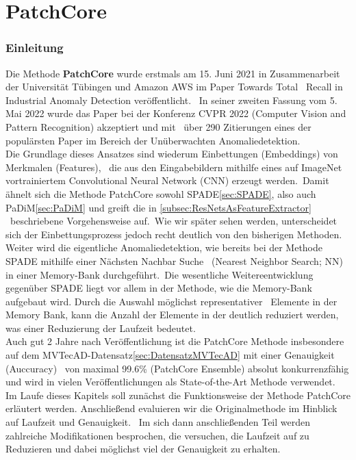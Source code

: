 
\chapter{PatchCore \cite{patchcore}}\label{ch:PatchCore}
\subsection{Einleitung}
Die Methode \textbf{PatchCore} wurde erstmals am 15. Juni 2021 in Zusammenarbeit der Universität Tübingen und Amazon AWS im Paper \glqq Towards Total \ 
Recall in Industrial Anomaly Detection\grqq{} veröffentlicht. \ 
In seiner zweiten Fassung vom 5. Mai 2022 wurde das Paper bei der Konferenz CVPR 2022 (Computer Vision and Pattern Recognition) akzeptiert und mit \ 
über 290 Zitierungen eines der populärsten Paper im Bereich der Unüberwachten Anomaliedetektion.\\
Die Grundlage dieses Ansatzes sind wiederum \glqq Einbettungen\grqq{} (Embeddings) von Merkmalen (Features), \ 
die aus den Eingabebildern mithilfe eines auf \glqq ImageNet\grqq{} vortrainiertem \glqq Convolutional Neural Network (CNN)\grqq{} erzeugt werden.\
Damit ähnelt sich die Methode PatchCore sowohl SPADE\ref{sec:SPADE}, also auch PaDiM\ref{sec:PaDiM} und greift die in \ref{subsec:ResNetsAsFeatureExtractor} \
beschriebene Vorgehensweise auf.\
Wie wir später sehen werden, unterscheidet sich der Einbettungsprozess jedoch recht deutlich von den bisherigen Methoden.\
Weiter wird die eigentliche Anomaliedetektion, wie bereits bei der Methode SPADE mithilfe einer Nächsten Nachbar Suche \ 
(Nearest Neighbor Search; NN) in einer \glqq Memory-Bank \grqq{} durchgeführt.\
Die wesentliche Weitereentwicklung gegenüber SPADE liegt vor allem in der Methode, wie die Memory-Bank aufgebaut wird. Durch die Auswahl möglichst representativer \
Elemente in der Memory Bank, kann die Anzahl der Elemente in der deutlich reduziert werden, was einer Reduzierung der Laufzeit bedeutet.\\
Auch gut 2 Jahre nach Veröffentlichung ist die PatchCore Methode insbesondere auf dem MVTecAD-Datensatz\ref{sec:DatensatzMVTecAD} mit einer Genauigkeit (Auccuracy) \ 
von maximal \num{99,6}\% (\glqq PatchCore Ensemble\grqq{}) absolut konkurrenzfähig und wird in vielen Veröffentlichungen als \glqq State-of-the-Art\grqq{} Methode verwendet.\\
Im Laufe dieses Kapitels soll zunächst die Funktionsweise der Methode PatchCore erläutert werden. Anschließend evaluieren wir die Originalmethode im Hinblick auf Laufzeit und Genauigkeit. \
Im sich dann anschließenden Teil werden zahlreiche Modifikationen besprochen, die versuchen, die Laufzeit auf zu Reduzieren und dabei möglichst viel der Genauigkeit zu erhalten.\

